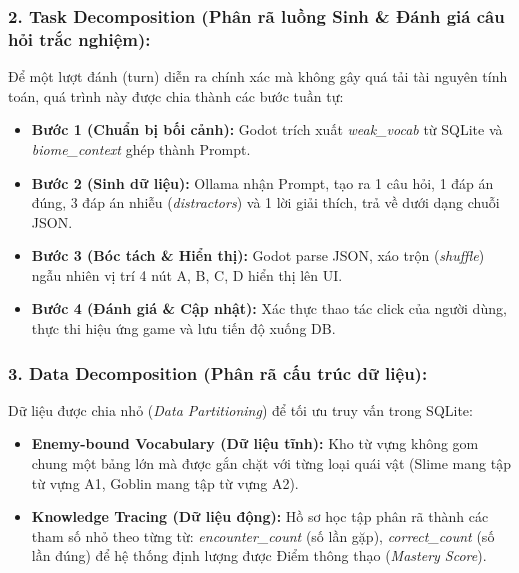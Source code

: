 \subsubsection*{2. Task Decomposition (Phân rã luồng Sinh \& Đánh giá câu hỏi trắc nghiệm):}
Để một lượt đánh (turn) diễn ra chính xác mà không gây quá tải tài nguyên tính toán, quá trình này được chia thành các bước tuần tự:
\begin{itemize}
    \item \textbf{Bước 1 (Chuẩn bị bối cảnh):} Godot trích xuất \textit{weak\_vocab} từ SQLite và \textit{biome\_context} ghép thành Prompt.
    \item \textbf{Bước 2 (Sinh dữ liệu):} Ollama nhận Prompt, tạo ra 1 câu hỏi, 1 đáp án đúng, 3 đáp án nhiễu (\textit{distractors}) và 1 lời giải thích, trả về dưới dạng chuỗi JSON.
    \item \textbf{Bước 3 (Bóc tách \& Hiển thị):} Godot parse JSON, xáo trộn (\textit{shuffle}) ngẫu nhiên vị trí 4 nút A, B, C, D hiển thị lên UI.
    \item \textbf{Bước 4 (Đánh giá \& Cập nhật):} Xác thực thao tác click của người dùng, thực thi hiệu ứng game và lưu tiến độ xuống DB.
\end{itemize}

\subsubsection*{3. Data Decomposition (Phân rã cấu trúc dữ liệu):}
Dữ liệu được chia nhỏ (\textit{Data Partitioning}) để tối ưu truy vấn trong SQLite:
\begin{itemize}
    \item \textbf{Enemy-bound Vocabulary (Dữ liệu tĩnh):} Kho từ vựng không gom chung một bảng lớn mà được gắn chặt với từng loại quái vật (Slime mang tập từ vựng A1, Goblin mang tập từ vựng A2).
    \item \textbf{Knowledge Tracing (Dữ liệu động):} Hồ sơ học tập phân rã thành các tham số nhỏ theo từng từ: \textit{encounter\_count} (số lần gặp), \textit{correct\_count} (số lần đúng) để hệ thống định lượng được Điểm thông thạo (\textit{Mastery Score}).
\end{itemize}

